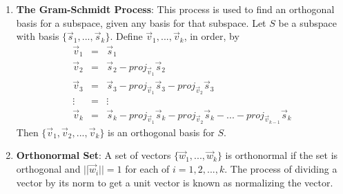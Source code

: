 \documentclass[10pt]{article}
\begin{document}
\begin{enumerate}
\item \textbf{The Gram-Schmidt Process}: This process is used to find an orthogonal basis for a subspace, given any basis for that subspace. Let $S$ be a subspace with basis $\lbrace \vec{s}_1,...,\vec{s}_k \rbrace$. Define $\vec{v}_1,...,\vec{v}_k$, in order, by 
\begin{eqnarray*}
\vec{v}_1 &=& \vec{s}_1 \\
\vec{v}_2 &=& \vec{s}_2 - proj_{\vec{v}_1}\vec{s}_2 \\
\vec{v}_3 &=& \vec{s}_3 - proj_{\vec{v}_1}\vec{s}_3 - proj_{\vec{v}_2}\vec{s}_3 \\
\vdots &=& \vdots \\
\vec{v}_k &=& \vec{s}_k - proj_{\vec{v}_1}\vec{s}_k - proj_{\vec{v}_2}\vec{s}_k - ... - proj_{\vec{v}_{k-1}}\vec{s}_k
\end{eqnarray*}
Then $\lbrace \vec{v}_1,\vec{v}_2,...,\vec{v}_k \rbrace$ is an orthogonal basis for $S$.
\item \textbf{Orthonormal Set}: A set of vectors $\lbrace \vec{w}_1,...,\vec{w}_k \rbrace$ is orthonormal if the set is orthogonal and $||\vec{w}_i|| = 1$ for each of $i = 1,2,...,k$. The process of dividing a vector by its norm to get a unit vector is known as normalizing the vector.
\end{enumerate}
\end{document}

